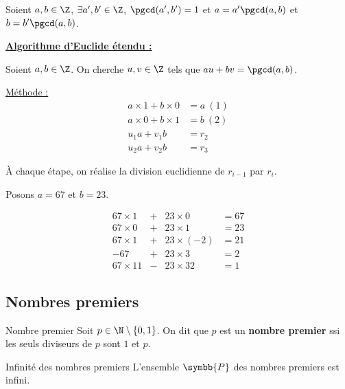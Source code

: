 \begin{proposition}{}{}
    Soient $a,b \in \Z$, $\exists a',b' \in \Z$, $\pgcd(a',b') = 1$ et $a = a'\pgcd(a,b)$ et $b = b'\pgcd(a,b)$.
\end{proposition}

\uline{\textbf{Algorithme d'Euclide étendu :}}

Soient $a, b \in \Z$. On cherche $u, v \in \Z$ tels que $au + bv = \pgcd(a, b)$.

\uline{Méthode :}
\begin{align*}
    a \times 1 + b \times 0 & = a~(1)\\
    a \times 0 + b \times 1 & = b~(2)\\
    u_1 a + v_1 b & = r_2 \\
    u_2 a + v_2 b & = r_3 
\end{align*}

À chaque étape, on réalise la division euclidienne de $r_{i-1}$ par $r_i$.

\begin{exemple}
    Posons $a = 67$ et $b = 23$. 

    \[\begin{array}{rccl}
        67 \times 1 & + & 23 \times 0 & = 67 \\
        67 \times 0 & + & 23 \times 1 & = 23 \\
        67 \times 1 & + & 23 \times (-2) & = 21 \\
        -67 & + & 23 \times 3 & = 2 \\
        67 \times 11 & - & 23 \times 32 & = 1
    \end{array}\]
\end{exemple}

\subsection{Nombres premiers}


\begin{definition}{Nombre premier}{}
    Soit $p \in \N \setminus \{0, 1\}$. On dit que $p$ est un \textbf{nombre premier} ssi
    les seuls diviseurs de $p$ sont $1$ et $p$.
\end{definition}

\begin{proposition}{Infinité des nombres premiers}{}
    L'ensemble $\symbb{P}$ des nombres premiers est infini.
\end{proposition}

